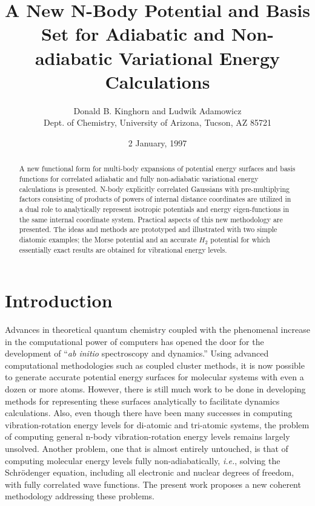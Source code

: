 \documentclass[12pt,thmsa]{article}
\begin{document}
\author{Donald B. Kinghorn and Ludwik Adamowicz \\
Dept. of Chemistry, University of Arizona, Tucson, AZ 85721}
\title{A New N-Body Potential and Basis Set for Adiabatic and Non-adiabatic
Variational Energy Calculations }
\date{2 January, 1997}
\maketitle

\begin{abstract}
A new functional form for multi-body expansions of potential energy surfaces
and basis functions for correlated adiabatic and fully non-adiabatic
variational energy calculations is presented. N-body explicitly correlated
Gaussians with pre-multiplying factors consisting of products of powers of
internal distance coordinates are utilized in a dual role to analytically
represent isotropic potentials and energy eigen-functions in the same
internal coordinate system. Practical aspects of this new methodology are
presented. The ideas and methods are prototyped and illustrated with two
simple diatomic examples; the Morse potential and an accurate $H_2$
potential for which essentially exact results are obtained for vibrational
energy levels.
\end{abstract}

\section{Introduction}

Advances in theoretical quantum chemistry coupled with the phenomenal
increase in the computational power of computers has opened the door for the
development of ``\emph{ab initio} spectroscopy and dynamics.'' Using
advanced computational methodologies such as coupled cluster methods\cite
{Bartlett95}, it is now possible to generate accurate potential energy
surfaces for molecular systems with even a dozen or more atoms. However,
there is still much work to be done in developing methods for representing
these surfaces analytically to facilitate dynamics calculations. Also, even
though there have been many successes in computing vibration-rotation energy
levels for di-atomic and tri-atomic systems, the problem of computing
general n-body vibration-rotation energy levels remains largely unsolved.
Another problem, one that is almost entirely untouched, is that of computing
molecular energy levels fully non-adiabatically, \textit{i.e.}, solving the
Schr\"{o}denger equation, including all electronic and nuclear degrees of
freedom, with fully correlated wave functions. The present work proposes a
new coherent methodology addressing these problems.
\end{document}

